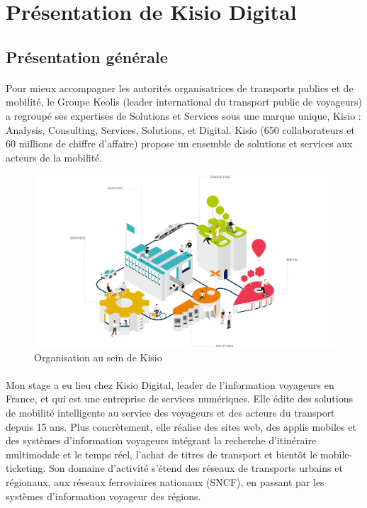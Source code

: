\documentclass[a4paper]{report}
\begin{document}
\section{Présentation de Kisio Digital}
\subsection{Présentation générale}
			
\paragraph{} Pour mieux accompagner les autorités organisatrices de transports publics et de mobilité, le Groupe Keolis (leader  international du transport public de voyageurs) a regroupé ses expertises de Solutions et Services sous une marque unique, Kisio : Analysis, Consulting, Services, Solutions, et Digital. Kisio (650 collaborateurs et 60 millions de chiffre d'affaire) propose un ensemble de solutions et services aux acteurs de la mobilité.

\begin{figure}[H] 
	\begin{center}
		\includegraphics[width=500pt]{image/orga_kisio}
		\caption{Organisation au sein de Kisio}
		\label{Organisation au sein de Kisio}
	\end{center}
\end{figure}

\paragraph{} Mon stage a eu lieu chez Kisio Digital, leader de l'information voyageurs en France, et qui est une entreprise de services numériques. Elle édite des solutions de mobilité intelligente au service des voyageurs et des acteurs du transport depuis 15 ans. Plus concrètement, elle réalise  des sites web, des applis mobiles et des systèmes d’information voyageurs intégrant la recherche d’itinéraire multimodale et le temps réel, l’achat de titres de transport et bientôt le mobile-ticketing. Son domaine d’activité s’étend des réseaux de transports urbains et régionaux, aux réseaux ferroviaires nationaux (SNCF), en passant par les systèmes d’information voyageur des régions. 
				
\end{document}
